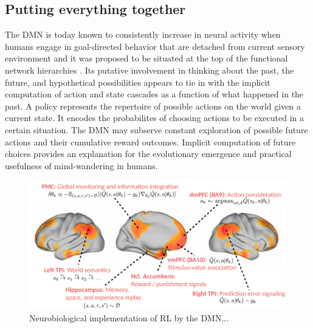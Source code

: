 \documentclass[10pt,letterpaper]{article}
\begin{document}
\subsection{Putting everything together}
The DMN is today known to consistently increase in neural
  activity when humans engage in goal-directed behavior that are detached from
  current sensory environment \citep{kenet2003spontaneously, fiser2004small}
  and it was proposed to be situated at the top of the functional network hierarchies
  \citep{carhart2010default, margulies2016situating}.
  Its putative involvement in thinking about the past,
  the future, and hypothetical possibilities
  appears to tie in with the implicit computation of
  action and state cascades as a function of what happened in the past.
  A policy represents the repertoire of possible actions
    on the world given a current state. It encodes the probabilites of
    choosing actions to be executed in a certain situation.
The DMN may subserve
  constant exploration of possible future actions and their
  cumulative reward outcomes. Implicit computation of future choices
  provides an explanation for the
  evolutionary emergence and practical usefulness of mind-wandering
  in humans.
\begin{figure}[!h]
  \includegraphics[width=.9\linewidth]{neurobiological_and_rl_overview_DMN.pdf}
  \caption{Neurobiological implementation of RL by the DMN...}
  \label{fig:rl_process_chart}
\end{figure}
\end{document}
